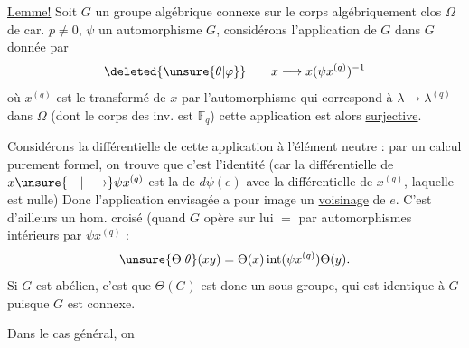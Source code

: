 \uline{Lemme!} Soit $G$ un groupe algébrique connexe sur le corps algébriquement clos $\Omega$ de car. $p\ne0$,   $\psi$ un automorphisme   $G$, considérons   l'application de $G$ dans $G$ donnée par
\[
\deleted{\unsure{\theta|\varphi}}\qquad x\longrightarrow x(\psi x^{(q)})^{-1}
\]
où $x^{(q)}$ est le transformé de $x$ par l'automorphisme qui correspond à $\lambda\longrightarrow\lambda^{(q)}$ dans $\Omega$ (dont le corps des inv. est $\mathbb F_q$) cette application est alors \uline{surjective}.

Considérons la différentielle de cette application à l'élément neutre : par un calcul purement formel, on trouve que c'est l'identité (car la différentielle de $x\unsure{\text{---}|\longrightarrow}\psi x^{(q)}$ est la  de $d\psi(e)$ avec la différentielle de $x^{(q)}$, laquelle est nulle)
Donc l'application envisagée a pour image un \uline{voisinage} de $e$. C'est d'ailleurs un hom. croisé (quand $G$ opère sur lui $=$ par automorphismes intérieurs par $\psi x^{(q)}$ :
\[
\unsure{\Theta|\theta}(xy)=\Theta(x)\operatorname{int}(\psi x^{(q)})\Theta(y).
\]
Si $G$ est abélien, c'est que $\Theta(G)$ est donc un sous-groupe, qui est  identique à $G$ puisque $G$ est connexe.

Dans le cas général, on 
